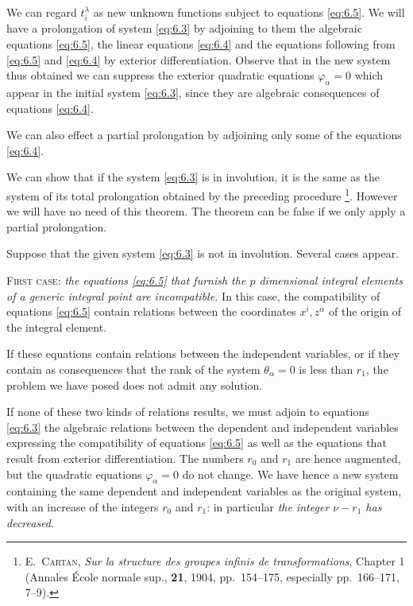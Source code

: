 We can regard $t_{i}^{\lambda}$ as new unknown functions subject to equations \eqref{eq:6.5}. We will have a prolongation of system \eqref{eq:6.3} by adjoining to them the algebraic equations \eqref{eq:6.5}, the linear equations \eqref{eq:6.4} and the equations following from \eqref{eq:6.5} and \eqref{eq:6.4} by exterior differentiation. Observe that in the new system thus obtained we can suppress the exterior quadratic equations $\varphi_{\alpha}=0$ which appear in the initial system \eqref{eq:6.3}, since they are algebraic consequences of equations \eqref{eq:6.4}.

We can also effect a partial prolongation by adjoining only some of the equations \eqref{eq:6.4}.

We can show that if the system \eqref{eq:6.3} is in involution, it is the same as the system of its total prolongation obtained by the preceding procedure \footnote{\textsc{E.~Cartan}, \emph{Sur la structure des groupes infinis de transformations}, Chapter 1 (Annales \'Ecole normale sup., \textbf{21}, 1904, pp.~154--175, especially pp.~166--171, \textsection{}7--9).}. However we will have no need of this theorem. The theorem can be false if we only apply a partial prolongation.

\vspace{12pt}\fsec Suppose that the given system \eqref{eq:6.3} is not in involution. Several cases appear.

\vspace{12pt}\textsc{First case}: \emph{the equations \eqref{eq:6.5} that furnish the $p$ dimensional integral elements of a generic integral point are incompatible.} In this case, the compatibility of equations \eqref{eq:6.5} contain relations between the coordinates $x^{i},z^{\alpha}$ of the origin of the integral element.

If these equations contain relations between the independent variables, or if they contain as consequences that the rank of the system $\theta_{\alpha}=0$ is less than $r_{1}$, the problem we have posed does not admit any solution.

If none of these two kinds of relations results, we must adjoin to equations \eqref{eq:6.3} the algebraic relations between the dependent and independent variables expressing the compatibility of equations \eqref{eq:6.5} as well as the equations that result from exterior differentiation. The numbers $r_{0}$ and $r_{1}$ are hence augmented, but the quadratic equations $\varphi_{\alpha}=0$ do not change. We have hence a new system containing the same dependent and independent variables as the original system, with an increase of the integers $r_{0}$ and $r_{1}$: in particular \emph{the integer $\nu-r_{1}$ has decreased}.

